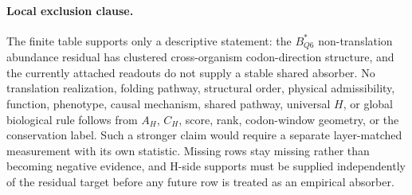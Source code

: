 \paragraph{Local exclusion clause.}
The finite table supports only a descriptive statement: the $B^{*}_{Q6}$ non-translation abundance residual has clustered cross-organism codon-direction structure, and the currently attached readouts do not supply a stable shared absorber.  No translation realization, folding pathway, structural order, physical admissibility, function, phenotype, causal mechanism, shared pathway, universal $H$, or global biological rule follows from $A_H$, $C_H$, score, rank, codon-window geometry, or the conservation label.  Such a stronger claim would require a separate layer-matched measurement with its own statistic.  Missing rows stay missing rather than becoming negative evidence, and H-side supports must be supplied independently of the residual target before any future row is treated as an empirical absorber.